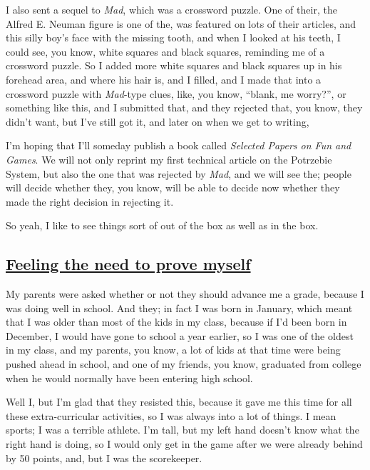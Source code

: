 \documentclass[]{article}
\begin{document}
I also sent a sequel to \emph{Mad}, which was a crossword puzzle. One of
their, the Alfred E. Neuman figure is one of the, was featured on lots
of their articles, and this silly boy's face with the missing tooth, and
when I looked at his teeth, I could see, you know, white squares and
black squares, reminding me of a crossword puzzle. So I added more white
squares and black squares up in his forehead area, and where his hair
is, and I filled, and I made that into a crossword puzzle with
\emph{Mad}-type clues, like, you know, ``blank, me worry?'', or
something like this, and I submitted that, and they rejected that, you
know, they didn't want, but I've still got it, and later on when we get
to writing,

I'm hoping that I'll someday publish a book called \emph{Selected Papers
on Fun and Games}. We will not only reprint my first technical article
on the Potrzebie System, but also the one that was rejected by
\emph{Mad}, and we will see the; people will decide whether they, you
know, will be able to decide now whether they made the right decision in
rejecting it.

So yeah, I like to see things sort of out of the box as well as in the
box.

\subsection{\texorpdfstring{\href{http://webofstories.com/play/17068}{Feeling
the need to prove
myself}}{Feeling the need to prove myself}}\label{feeling-the-need-to-prove-myself}

My parents were asked whether or not they should advance me a grade,
because I was doing well in school. And they; in fact I was born in
January, which meant that I was older than most of the kids in my class,
because if I'd been born in December, I would have gone to school a year
earlier, so I was one of the oldest in my class, and my parents, you
know, a lot of kids at that time were being pushed ahead in school, and
one of my friends, you know, graduated from college when he would
normally have been entering high school.

Well I, but I'm glad that they resisted this, because it gave me this
time for all these extra-curricular activities, so I was always into a
lot of things. I mean sports; I was a terrible athlete. I'm tall, but my
left hand doesn't know what the right hand is doing, so I would only get
in the game after we were already behind by 50 points, and, but I was
the scorekeeper.
\end{document}
